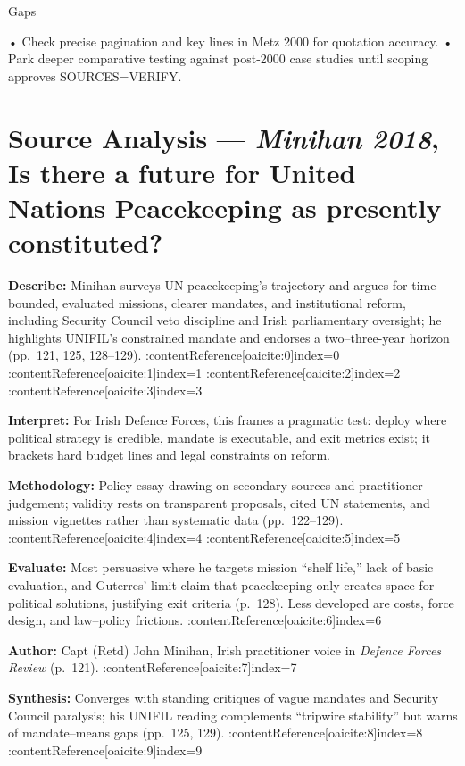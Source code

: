 Gaps

• Check precise pagination and key lines in Metz 2000 for quotation accuracy.
• Park deeper comparative testing against post-2000 case studies until scoping approves SOURCES=VERIFY.

\parencite{MINIHAN_2018}

\section*{Source Analysis — \textit{Minihan 2018}, Is there a future for United Nations Peacekeeping as presently constituted?}
\textbf{Describe:} Minihan surveys UN peacekeeping’s trajectory and argues for time-bounded, evaluated missions, clearer mandates, and institutional reform, including Security Council veto discipline and Irish parliamentary oversight; he highlights UNIFIL’s constrained mandate and endorses a two–three-year horizon (pp.~121, 125, 128–129). :contentReference[oaicite:0]{index=0} :contentReference[oaicite:1]{index=1} :contentReference[oaicite:2]{index=2} :contentReference[oaicite:3]{index=3}

\textbf{Interpret:} For Irish Defence Forces, this frames a pragmatic test: deploy where political strategy is credible, mandate is executable, and exit metrics exist; it brackets hard budget lines and legal constraints on reform.

\textbf{Methodology:} Policy essay drawing on secondary sources and practitioner judgement; validity rests on transparent proposals, cited UN statements, and mission vignettes rather than systematic data (pp.~122–129). :contentReference[oaicite:4]{index=4} :contentReference[oaicite:5]{index=5}

\textbf{Evaluate:} Most persuasive where he targets mission “shelf life,” lack of basic evaluation, and Guterres’ limit claim that peacekeeping only creates space for political solutions, justifying exit criteria (p.~128). Less developed are costs, force design, and law–policy frictions. :contentReference[oaicite:6]{index=6}

\textbf{Author:} Capt (Retd) John Minihan, Irish practitioner voice in \textit{Defence Forces Review} (p.~121). :contentReference[oaicite:7]{index=7}

\textbf{Synthesis:} Converges with standing critiques of vague mandates and Security Council paralysis; his UNIFIL reading complements “tripwire stability” but warns of mandate–means gaps (pp.~125, 129). :contentReference[oaicite:8]{index=8} :contentReference[oaicite:9]{index=9}

